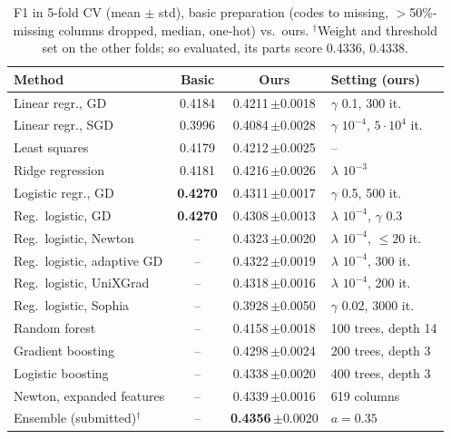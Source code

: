 \documentclass[10pt,conference,compsocconf]{IEEEtran}
\newcommand{\pmstd}[1]{\,{\scriptsize$\pm$#1}}
\begin{document}
\begin{table}[t]
  \centering
  \footnotesize
  \caption{F1 in 5-fold CV (mean $\pm$ std), basic preparation (codes to missing,
    $>$50\%-missing columns dropped, median, one-hot) vs.\ ours. $^\dagger$Weight and
    threshold set on the other folds; so evaluated, its parts score 0.4336, 0.4338.}
  \label{tab:baselines}
  \setlength{\tabcolsep}{3.5pt}
  \begin{tabular}{@{}l c c l@{}}
    \toprule
    Method & Basic & Ours & Setting (ours) \\
    \midrule
    Linear regr., GD & 0.4184 & 0.4211\pmstd{0.0018} & $\gamma$ 0.1, 300 it. \\
    Linear regr., SGD & 0.3996 & 0.4084\pmstd{0.0028} & $\gamma$ $10^{-4}$, $5{\cdot}10^4$ it. \\
    Least squares & 0.4179 & 0.4212\pmstd{0.0025} & -- \\
    Ridge regression & 0.4181 & 0.4216\pmstd{0.0026} & $\lambda$ $10^{-3}$ \\
    Logistic regr., GD & \textbf{0.4270} & 0.4311\pmstd{0.0017} & $\gamma$ 0.5, 500 it. \\
    Reg.\ logistic, GD & \textbf{0.4270} & 0.4308\pmstd{0.0013} & $\lambda$ $10^{-4}$, $\gamma$ 0.3 \\
    \midrule
    Reg.\ logistic, Newton & -- & 0.4323\pmstd{0.0020} & $\lambda$ $10^{-4}$, ${\leq}20$ it. \\
    Reg.\ logistic, adaptive GD & -- & 0.4322\pmstd{0.0019} & $\lambda$ $10^{-4}$, 300 it. \\
    Reg.\ logistic, UniXGrad & -- & 0.4318\pmstd{0.0016} & $\lambda$ $10^{-4}$, 200 it. \\
    Reg.\ logistic, Sophia & -- & 0.3928\pmstd{0.0050} & $\gamma$ 0.02, 3000 it. \\
    Random forest & -- & 0.4158\pmstd{0.0018} & 100 trees, depth 14 \\
    Gradient boosting & -- & 0.4298\pmstd{0.0024} & 200 trees, depth 3 \\
    Logistic boosting & -- & 0.4338\pmstd{0.0020} & 400 trees, depth 3 \\
    Newton, expanded features & -- & 0.4339\pmstd{0.0016} & 619 columns \\
    Ensemble (submitted)$^\dagger$ & -- & \textbf{0.4356}\pmstd{0.0020} & $a = 0.35$ \\
    \bottomrule
  \end{tabular}
\end{table}
\end{document}
